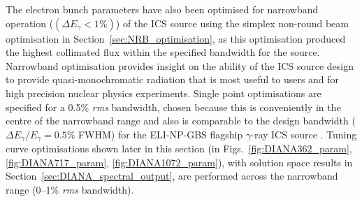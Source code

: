 \documentclass[../main.tex]{subfiles}
\begin{document}
The electron bunch parameters have also been optimised for narrowband operation ($\left(\Delta E_{\gamma}<1\%\right)$) of the ICS source using the simplex non-round beam optimisation in Section~\ref{sec:NRB_optimisation}, as this optimisation produced the highest collimated flux within the specified bandwidth for the source. Narrowband optimisation provides insight on the ability of the ICS source design to provide quasi-monochromatic radiation that is most useful to users and for high precision nuclear physics experiments. Single point optimisations are specified for a 0.5\% \textit{rms} bandwidth, chosen because this is conveniently in the centre of the narrowband range and also is comparable to the design bandwidth ($\Delta E_{\gamma}/E_{\gamma}=0.5\%$ FWHM) for the ELI-NP-GBS flagship $\gamma$-ray ICS source \cite{elinp2019vega}. Tuning curve optimisations shown later in this section (in Figs.~\ref{fig:DIANA362_param}, \ref{fig:DIANA717_param}, \ref{fig:DIANA1072_param}), with solution space results in Section~\ref{sec:DIANA_spectral_output}, are performed across the narrowband range (0--1\% \textit{rms} bandwidth).    
\end{document}
